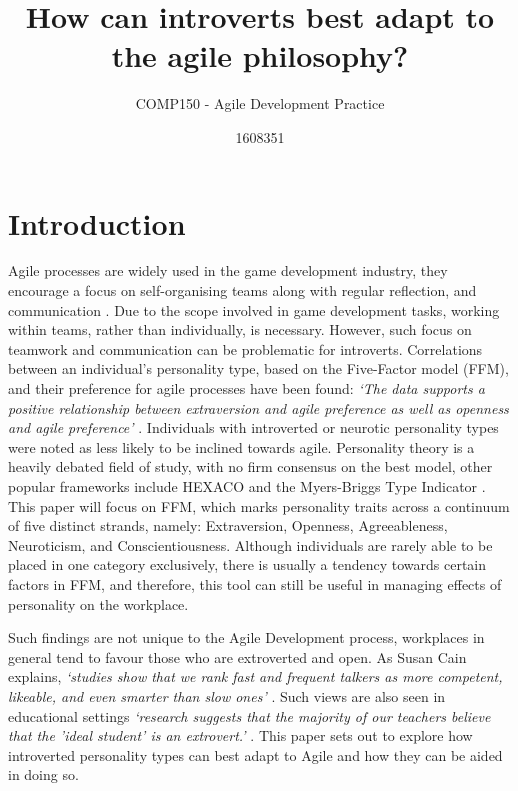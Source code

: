 \documentclass{scrartcl}
\title{How can introverts best adapt to the agile philosophy?}
\subtitle{COMP150 - Agile Development Practice}
\author{1608351}
\begin{document}
\maketitle


\section{Introduction}

Agile processes are widely used in the game development industry, they encourage a focus on self-organising teams along with regular reflection, and communication \cite{Agile}. Due to the scope involved in game development tasks, working within teams, rather than individually, is necessary. However, such focus on teamwork and communication can be problematic for introverts. Correlations between an individual's personality type, based on the Five-Factor model (FFM), and their preference for agile processes have been found: \textit{`The data supports a positive relationship between extraversion and agile preference as well as openness and agile preference'} \cite[p. 4756]{BishopDeokar}. Individuals with introverted or neurotic personality types were noted as less likely to be inclined towards agile. Personality theory is a heavily debated field of study, with no firm consensus on the best model, other popular frameworks include HEXACO and the Myers-Briggs Type Indicator \cite{McCrae}. This paper will focus on FFM, which marks personality traits across a continuum of five distinct strands, namely: Extraversion, Openness, Agreeableness, Neuroticism, and Conscientiousness. Although individuals are rarely able to be placed in one category exclusively, there is usually a tendency towards certain factors in FFM, and therefore, this tool can still be useful in managing effects of personality on the workplace.

Such findings are not unique to the Agile Development process, workplaces in general tend to favour those who are extroverted and open. As Susan Cain explains, \textit{`studies show that we rank fast and frequent talkers as more competent, likeable, and even smarter than slow ones' }\cite[p. 8]{Cain}. Such views are also seen in educational settings \textit{`research suggests that the majority of our teachers believe that the 'ideal student' is an extrovert.'} \cite[p. 27]{Cain}. This paper sets out to explore how introverted personality types can best adapt to Agile and how they can be aided in doing so.
\end{document}
